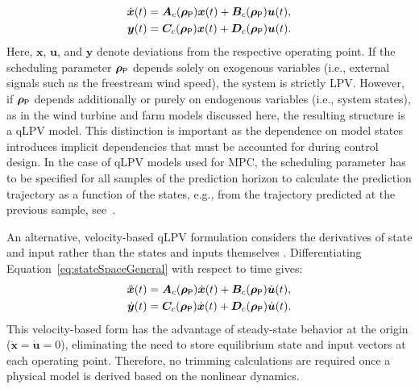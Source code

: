 \begin{equation} \label{eq:standardqLPV1}
    \begin{aligned}
        \dot{\bm{x}}(t) &= \bm{A}_c(\bm{\rho}_{\mathsf{P}}) \bm{x}(t) + \bm{B}_c(\bm{\rho}_{\mathsf{P}}) \bm{u}(t), \\
        \bm{y}(t) &= \bm{C}_c(\bm{\rho}_{\mathsf{P}}) \bm{x}(t) + \bm{D}_c(\bm{\rho}_{\mathsf{P}}) \bm{u}(t). 
    \end{aligned}
\end{equation}
Here, $\bm{x}$, $\bm{u}$, and $\bm{y}$ denote deviations from the respective operating point. If the scheduling parameter $\bm{\rho}_{\mathsf{P}}$ depends solely on exogenous variables (i.e., external signals such as the freestream wind speed), the system is strictly LPV. However, if $\bm{\rho}_{\mathsf{P}}$ depends additionally or purely on endogenous variables (i.e., system states), as in the wind turbine and farm models discussed here, the resulting structure is a qLPV model. This distinction is important as the dependence on model states introduces implicit dependencies that must be accounted for during control design. In the case of qLPV models used for MPC, the scheduling parameter has to be specified for all samples of the prediction horizon to calculate the prediction trajectory as a function of the states, e.g., from the trajectory predicted at the previous sample, see~\cite{cisneros2016efficient}.

An alternative, velocity-based qLPV formulation considers the derivatives of state and input rather than the states and inputs themselves \cite{cisneros2020velocity}. Differentiating Equation~\eqref{eq:stateSpaceGeneral} with respect to time gives:
\begin{align*}
    \ddot{\bm{x}}(t) &= \bm{A}_c(\bm{\rho}_{\mathsf{P}}) \dot{\bm{x}}(t) +\bm{B}_c(\bm{\rho}_{\mathsf{P}}) \dot{\bm{u}}(t), \\
    \dot{\bm{y}}(t) &= \bm{C}_c(\bm{\rho}_{\mathsf{P}})  \dot{\bm{x}}(t) + \bm{D}_c(\bm{\rho}_{\mathsf{P}}) \dot{\bm{u}}(t).
\end{align*}
This velocity-based form has the advantage of steady-state behavior at the origin ($\dot{\bm{x}}=\dot{\bm{u}}=0$), eliminating the need to store equilibrium state and input vectors at each operating point. Therefore, no trimming calculations are required once a physical model is derived based on the nonlinear dynamics. 

